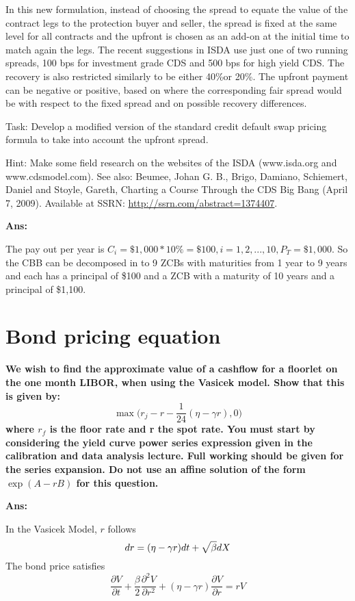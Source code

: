 \documentclass[11pt, notitlepage]{article}
\def\d{\mathnormal{d}}
\begin{document}
In this new formulation, instead of choosing the spread to equate the value of the contract legs to the protection buyer and seller, the spread is fixed at the same level for all contracts and the upfront is chosen as an add-on at the initial time to match again the legs. The recent suggestions in ISDA use just one of two running spreads, 100 bps for investment grade CDS and 500 bps for high yield CDS. The recovery is also restricted similarly to be either 40\%or 20\%. The upfront payment can be negative or positive, based on where the corresponding fair spread would be with respect to the fixed spread and on possible recovery differences.

Task: Develop a modified version of the standard credit default swap pricing formula to take into account the upfront spread.

Hint: Make some field research on the websites of the ISDA (www.isda.org and www.cdsmodel.com). See also: Beumee, Johan G. B., Brigo, Damiano, Schiemert, Daniel and Stoyle, Gareth, Charting a Course Through the CDS Big Bang (April 7, 2009). Available at SSRN: \url{http://ssrn.com/abstract=1374407}.
\mdseries

\vspace{5mm}
\textbf {Ans:}


The pay out per year is $C_i = \$1,000 * 10\% = \$100, i = 1,2,...,10, P_T = \$1,000 $. So the CBB can be decomposed in to 9 ZCBs with maturities from 1 year to 9 years and each has a principal of \$100 and a ZCB with a maturity of 10 years and a principal of \$1,100.

\newpage
\color{red}
\section{Bond pricing equation}
\color{black}

\textbf {We wish to find the approximate value of a cashflow for a floorlet on the one month LIBOR, when using the Vasicek model. Show that this is given by:
$$\max\bigg(r_j - r -\frac{1}{24}( \eta - \gamma r), 0 \bigg)$$
where $r_f$ is the floor rate and r the spot rate. You must start by considering the yield curve power series expression given in the calibration and data analysis lecture. Full working should be given for the series expansion. Do not use an affine solution of the form $\exp(A-rB)$ for this question.}

\vspace{5mm}
\textbf {Ans:}

In the Vasicek Model, $r$ follows
$$\d r = (\eta - \gamma r)dt + \sqrt{\beta}dX$$
The bond price satisfies
$$ \frac{\partial V}{\partial t} + \frac{\beta}{2} \frac{\partial^2 V}{\partial r^2} + (\eta - \gamma r)\frac{\partial V}{\partial r} = rV$$
\end{document}
